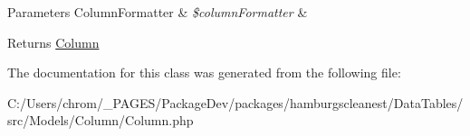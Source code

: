 \begin{DoxyParams}[1]{Parameters}
Column\+Formatter & {\em \$column\+Formatter} & \\
\hline
\end{DoxyParams}
\begin{DoxyReturn}{Returns}
\hyperlink{classhamburgscleanest_1_1_data_tables_1_1_models_1_1_column_1_1_column}{Column} 
\end{DoxyReturn}


The documentation for this class was generated from the following file\+:\begin{DoxyCompactItemize}
\item 
C\+:/\+Users/chrom/\+\_\+\+P\+A\+G\+E\+S/\+Package\+Dev/packages/hamburgscleanest/\+Data\+Tables/src/\+Models/\+Column/Column.\+php\end{DoxyCompactItemize}
